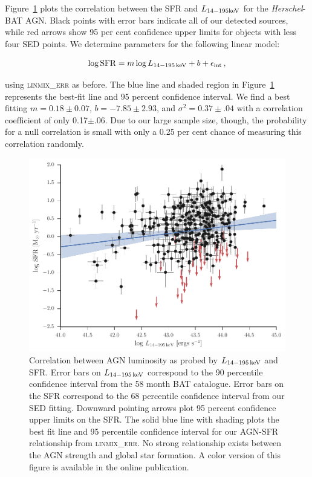 \documentclass[fleqn, usenatbib]{mnras}
\newcommand{\herschel}{\emph{Herschel}}
\begin{document}
Figure~\ref{fig:sfr_lbat_correlation} plots the correlation between the SFR and $L_{\rm 14-195 keV}$ for the \herschel-BAT AGN. Black points with error bars indicate all of our detected sources, while red arrows show 95 per cent confidence upper limits for objects with less four SED points. We determine parameters for the following linear model:

\begin{equation}
\log {\rm SFR} = m\log L_{\rm 14-195\,keV} + b + \epsilon_{\rm int}\,,
\end{equation}

\noindent using \textsc{linmix\_err} as before. The blue line and shaded region in Figure~\ref{fig:sfr_lbat_correlation} represents the best-fit line and 95 percent confidence interval. We find a best fitting $m=0.18\pm0.07$, $b=-7.85\pm2.93$, and $\sigma^2=0.37\pm.04$ with a correlation coefficient of only 0.17$\pm$.06. Due to our large sample size, though, the probability for a null correlation is small with only a 0.25 per cent chance of measuring this correlation randomly.

\begin{figure}
\includegraphics{figures/sfr_lbat_correlation_nosy}
\caption{Correlation between AGN luminosity as probed by $L_{\rm 14-195\,keV}$ and SFR. Error bars on $L_{\rm14-195\,keV}$ correspond to the 90 percentile confidence interval from the 58 month BAT catalogue. Error bars on the SFR correspond to the 68 percentile confidence interval from our SED fitting. Downward pointing arrows plot 95 percent confidence upper limits on the SFR. The solid blue line with shading plots the best fit line and 95 percentile confidence interval for our AGN-SFR relationship from \textsc{linmix\_err}. No strong relationship exists between the AGN strength and global star formation. A color version of this figure is available in the online publication.\label{fig:sfr_lbat_correlation}}
\end{figure}
\end{document}
